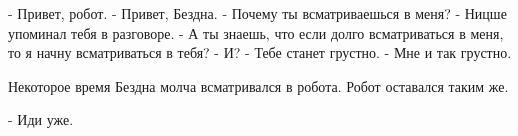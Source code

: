 - Привет, робот.
- Привет, Бездна.
- Почему ты всматриваешься в меня?
- Ницше упоминал тебя в разговоре.
- А ты знаешь, что если долго всматриваться в меня, то я начну всматриваться в тебя?
- И?
- Тебе станет грустно.
- Мне и так грустно.

Некоторое время Бездна молча всматривался в робота. Робот оставался таким же.

- Иди уже.